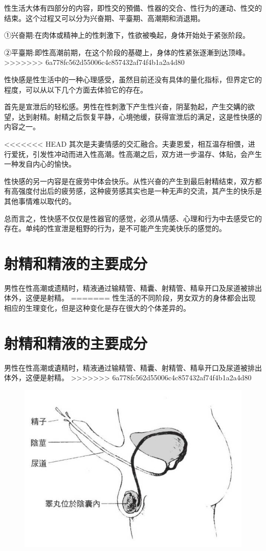 \documentclass[12pt,UTF8]{ctexbook}
\begin{document}
性生活大体有四部分的内容，即性交的預備、性器的交合、性行为的運动、性交的结束。这个过程又可以分为兴奋期、平臺期、高潮期和消退期。

①兴奋期:在肉体或精神上的性刺激下，性欲被喚起，身体开始处于紧张阶段。

②平臺期:即性高潮前期，在这个阶段的基礎上，身体的性紧张逐漸到达顶峰。
>>>>>>> 6a778fc562d55006c4c857432af74f4b1a2a4d80

性快感是性生活中的一种心理感受，虽然目前还没有具体的量化指标，但界定它的程度，可以从以下几个方面去体验它的存在。

首先是宣泄后的轻松感。男性在性刺激下产生性兴奋，阴茎勃起，产生交媾的欲望，达到射精。射精之后恢复平静，心境弛缓，获得宣泄后的满足，这是性快感的内容之一。

<<<<<<< HEAD
其次是夫妻情感的交汇融合。夫妻恩爱，相互温存相偎，进行爱抚，引发性冲动而进入性高潮。性高潮之后，双方进一步温存、体贴，会产生一种发自内心的愉快。

性快感的另一内容是在疲劳中体会快乐。从性兴奋的产生到最后射精结束，双方都有高强度付出后的疲劳感，这种疲劳感其实也是一种无声的交流，其产生的快乐是其他事情难以取代的。

总而言之，性快感不仅仅是性器官的感觉，必须从情感、心理和行为中去感受它的存在。单纯的性宣泄是粗野的行为，是不可能产生完美快乐的感觉的。

\section{射精和精液的主要成分}

男性在性高潮或遗精时，精液通过输精管、精囊、射精管、精阜开口及尿道被排出体外，这便是射精。
=======
性生活的不同阶段，男女双方的身体都会出现相应的生理变化，但是这种变化是存在很大的个体差异的。

\section{射精和精液的主要成分}

男性在性高潮或遺精时，精液通过输精管、精囊、射精管、精阜开口及尿道被排出体外，这便是射精。
>>>>>>> 6a778fc562d55006c4c857432af74f4b1a2a4d80

\begin{figure}[htbp]
	\centering
	\includegraphics[width=0.7\linewidth]{5}
	\caption{}
\end{figure}
\end{document}
